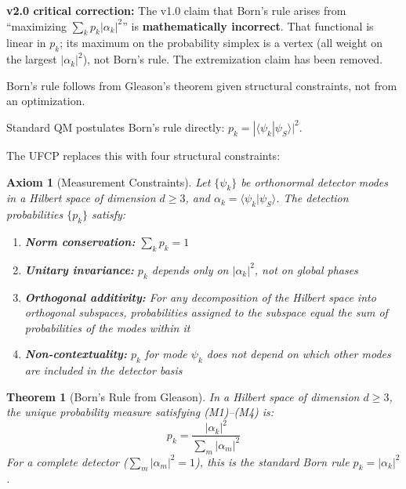 \documentclass[11pt, a4paper]{article}
\newtheorem{axiom}{Axiom}[section]
\newtheorem{theorem}{Theorem}[section]
\begin{document}
\textbf{v2.0 critical correction:} The v1.0 claim that Born's rule arises
from ``maximizing $\sum_k p_k |\alpha_k|^2$'' is \textbf{mathematically
incorrect}. That functional is linear in $p_k$; its maximum on the
probability simplex is a vertex (all weight on the largest $|\alpha_k|^2$),
not Born's rule. The extremization claim has been removed.

Born's rule follows from Gleason's theorem given structural constraints,
not from an optimization.

Standard QM postulates Born's rule directly: $p_k = |\langle \psi_k | \psi_S \rangle|^2$.

The UFCP replaces this with four structural constraints:

\begin{axiom}[Measurement Constraints]
\label{ax:measurement}
Let $\{\psi_k\}$ be orthonormal detector modes in a Hilbert space of
dimension $d \geq 3$, and $\alpha_k = \langle \psi_k | \psi_S \rangle$.
The detection probabilities $\{p_k\}$ satisfy:
\begin{enumerate}[label=(M\arabic*)]
  \item \textbf{Norm conservation:} $\sum_k p_k = 1$
  \item \textbf{Unitary invariance:} $p_k$ depends only on $|\alpha_k|^2$,
        not on global phases
  \item \textbf{Orthogonal additivity:} For any decomposition of the
        Hilbert space into orthogonal subspaces, probabilities assigned
        to the subspace equal the sum of probabilities of the modes
        within it
  \item \textbf{Non-contextuality:} $p_k$ for mode $\psi_k$ does not
        depend on which other modes are included in the detector basis
\end{enumerate}
\end{axiom}

\begin{theorem}[Born's Rule from Gleason]
\label{thm:born}
In a Hilbert space of dimension $d \geq 3$, the unique probability measure
satisfying (M1)--(M4) is:
\begin{equation}
  p_k = \frac{|\alpha_k|^2}{\sum_m |\alpha_m|^2}
\end{equation}
For a complete detector ($\sum_m |\alpha_m|^2 = 1$), this is the standard
Born rule $p_k = |\alpha_k|^2$.
\end{theorem}
\end{document}
